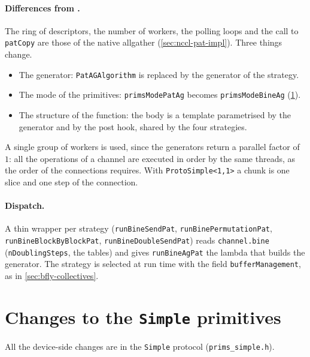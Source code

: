 \paragraph{Differences from \pat{}.}
The ring of descriptors, the number of workers, the polling loops and the call to \texttt{patCopy} are those of the native \pat{} allgather (\cref{sec:nccl-pat-impl}).
Three things change.
\begin{itemize}
  \item The generator: \texttt{PatAGAlgorithm} is replaced by the generator of the strategy.
  \item The mode of the primitives: \texttt{primsModePatAg} becomes \texttt{primsModeBineAg} (\cref{sec:pat-prims}).
  \item The structure of the function: the body is a template parametrised by the generator and by the post hook, shared by the four strategies.
\end{itemize}
A single group of workers is used, since the generators return a parallel factor of $1$: all the operations of a channel are executed in order by the same threads, as the order of the connections requires.
With \texttt{ProtoSimple<1,1>} a chunk is one slice and one step of the connection.

\paragraph{Dispatch.}
A thin wrapper per strategy (\texttt{runBineSendPat}, \texttt{runBinePermutationPat}, \texttt{runBineBlockByBlockPat}, \texttt{runBineDoubleSendPat}) reads \texttt{channel.bine} (\texttt{nDoublingSteps}, the tables) and gives \texttt{runBineAgPat} the lambda that builds the generator.
The strategy is selected at run time with the field \texttt{bufferManagement}, as in \cref{sec:bfly-collectives}.

\section{Changes to the \texttt{Simple} primitives}\label{sec:pat-prims}

All the device-side changes are in the \texttt{Simple} protocol (\texttt{prims\_simple.h}).

